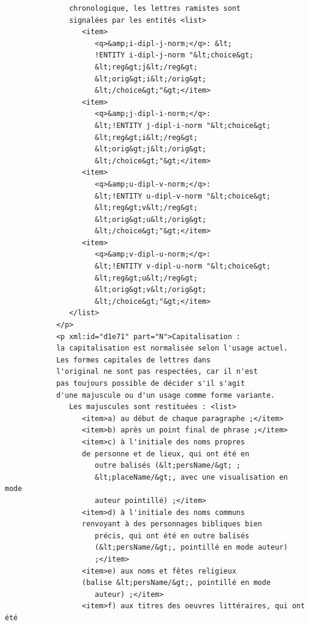 \documentclass[a4paper,12pt,twoside]{book}
\begin{document}
\begin{verbatim}
               chronologique, les lettres ramistes sont
               signalées par les entités <list>
                  <item>
                     <q>&amp;i-dipl-j-norm;</q>: &lt;
                     !ENTITY i-dipl-j-norm "&lt;choice&gt;
                     &lt;reg&gt;j&lt;/reg&gt;
                     &lt;orig&gt;i&lt;/orig&gt;
                     &lt;/choice&gt;"&gt;</item>
                  <item>
                     <q>&amp;j-dipl-i-norm;</q>: 
                     &lt;!ENTITY j-dipl-i-norm "&lt;choice&gt;
                     &lt;reg&gt;i&lt;/reg&gt;
                     &lt;orig&gt;j&lt;/orig&gt;
                     &lt;/choice&gt;"&gt;</item>
                  <item>
                     <q>&amp;u-dipl-v-norm;</q>: 
                     &lt;!ENTITY u-dipl-v-norm "&lt;choice&gt;
                     &lt;reg&gt;v&lt;/reg&gt;
                     &lt;orig&gt;u&lt;/orig&gt;
                     &lt;/choice&gt;"&gt;</item>
                  <item>
                     <q>&amp;v-dipl-u-norm;</q>: 
                     &lt;!ENTITY v-dipl-u-norm "&lt;choice&gt;
                     &lt;reg&gt;u&lt;/reg&gt;
                     &lt;orig&gt;v&lt;/orig&gt;
                     &lt;/choice&gt;"&gt;</item>
               </list>
            </p>
            <p xml:id="d1e71" part="N">Capitalisation : 
            la capitalisation est normalisée selon l'usage actuel. 
            Les formes capitales de lettres dans 
            l'original ne sont pas respectées, car il n'est 
            pas toujours possible de décider s'il s'agit 
            d'une majuscule ou d'un usage comme forme variante. 
               Les majuscules sont restituées : <list>
                  <item>a) au début de chaque paragraphe ;</item>
                  <item>b) après un point final de phrase ;</item>
                  <item>c) à l'initiale des noms propres 
                  de personne et de lieux, qui ont été en
                     outre balisés (&lt;persName/&gt; ; 
                     &lt;placeName/&gt;, avec une visualisation en mode
                     auteur pointillé) ;</item>
                  <item>d) à l'initiale des noms communs 
                  renvoyant à des personnages bibliques bien
                     précis, qui ont été en outre balisés 
                     (&lt;persName/&gt;, pointillé en mode auteur)
                     ;</item>
                  <item>e) aux noms et fêtes religieux 
                  (balise &lt;persName/&gt;, pointillé en mode
                     auteur) ;</item>
                  <item>f) aux titres des oeuvres littéraires, qui ont été 

\end{verbatim}
\end{document}
